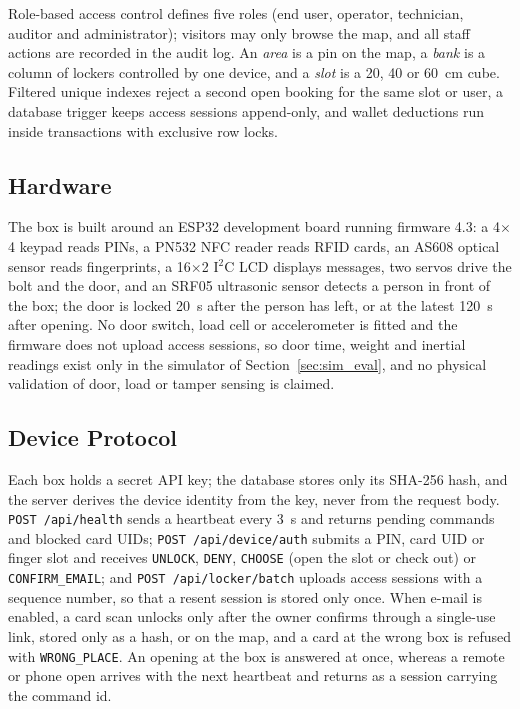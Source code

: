 \documentclass[sigconf,screen]{acmart}
\begin{document}
Role-based access control defines five roles (end user, operator, technician, auditor and administrator); visitors may only browse the map, and all staff actions are recorded in the audit
log. An \emph{area} is a pin on the map, a \emph{bank} is a column of lockers controlled by one device, and a
\emph{slot} is a 20, 40 or 60~cm cube. Filtered unique indexes reject a second open booking for the same slot or user, a
database trigger keeps access sessions append-only, and wallet deductions run inside transactions with exclusive row
locks.

\subsection{Hardware}

The box is built around an ESP32 development board running firmware 4.3: a 4$\times$4 keypad reads PINs, a PN532 NFC
reader reads RFID cards, an AS608 optical sensor reads fingerprints, a 16$\times$2 I$^2$C LCD displays messages, two
servos drive the bolt and the door, and an SRF05 ultrasonic sensor detects a person in front of the box; the door is
locked 20~s after the person has left, or at the latest 120~s after opening. No door switch, load cell or accelerometer is
fitted and the firmware does not upload access sessions, so door time, weight and inertial readings exist only in the
simulator of Section~\ref{sec:sim_eval}, and no physical validation of door, load or tamper sensing is claimed.

\subsection{Device Protocol}

Each box holds a secret API key; the database stores only its SHA-256 hash, and the server derives the device identity
from the key, never from the request body. \texttt{POST /api/health} sends a heartbeat every 3~s and returns pending
commands and blocked card UIDs; \texttt{POST /api/device/auth} submits a PIN, card UID or finger slot and receives
\texttt{UNLOCK}, \texttt{DENY}, \texttt{CHOOSE} (open the slot or check out) or \texttt{CONFIRM\_EMAIL}; and
\texttt{POST /api/locker/batch} uploads
access sessions with a sequence number, so that a resent session is stored only once. When e-mail is enabled, a card
scan unlocks only after the owner confirms through a single-use link, stored only as a hash, or on the map, and a card
at the wrong box is refused with \texttt{WRONG\_PLACE}. An opening at the box is answered at once, whereas a remote or
phone open arrives with the next heartbeat and returns as a session carrying the command id.
\end{document}
